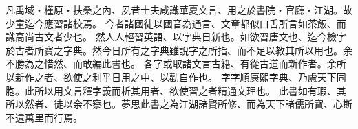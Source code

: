 凡禹域‧槿原‧扶桑之內、夙昔士夫咸識華夏文言、用之於書院‧官廳‧江湖。故少童迄今應習諸校焉。
今者諸國徒以國音為通言、文章都似口舌所言如茶飯、而識高尚古文者少也。
然人人輕習英語、以字典日新也。如欲習唐文也、迄今檢字於古者所寶之字典。然今日所有之字典雖說字之所指、而不足以教其所以用也。余不勝為之惜然、而敢編此書也。
各字或取諸文言古籍、有從古道而新作者。余所以新作之者、欲使之利乎日用之中、以勸自作也。
字字順康熙字典、乃慮天下同胞。此所以用文言釋字義而析其用者、欲使習之者精通文理也。
此書如有瑕、其所以然者、徒以余不察也。夢思此書之為江湖諸賢所修、而為天下諸儒所寶、心斯不遠萬里而行焉。
